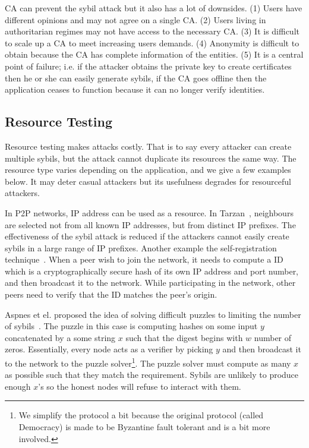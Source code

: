CA can prevent the sybil attack but it also has a lot of downsides. (1) Users
have different opinions and may not agree on a single CA. (2) Users living in
authoritarian regimes may not have access to the necessary CA. (3) It is
difficult to scale up a CA to meet increasing users demands. (4) Anonymity is
difficult to obtain because the CA has complete information of the entities. (5)
It is a central point of failure; i.e. if the attacker obtains the private key
to create certificates then he or she can easily generate sybils, if the CA goes
offline then the application ceases to function because it can no longer verify
identities.


\subsection{Resource Testing}\label{sec:resource-testing}
Resource testing makes attacks costly. That is to say every attacker can create
multiple sybils, but the attack cannot duplicate its resources the same way. The
resource type varies depending on the application, and we give a few examples
below. It may deter casual attackers but its usefulness degrades for resourceful
attackers.


In P2P networks, IP address can be used as a resource. In
Tarzan~\cite{freedman2002tarzan}, neighbours are selected not from all known IP
addresses, but from distinct IP prefixes. The effectiveness of the sybil attack
is reduced if the attackers cannot easily create sybils in a large range of IP
prefixes. Another example the self-registration
technique~\cite{dinger2006defending}. When a peer wish to join the network, it
needs to compute a ID which is a cryptographically secure hash of its own IP
address and port number, and then broadcast it to the network. While
participating in the network, other peers need to verify that the ID matches
the peer's origin.

Aspnes et el. proposed the idea of solving difficult puzzles to limiting the
number of sybils~\cite{aspnes2005exposing}. The puzzle in this case is computing
hashes on some input $y$ concatenated by a some string $x$ such that the digest
begins with $w$ number of zeros. Essentially, every node acts as a verifier by
picking $y$ and then broadcast it to the network to the puzzle
solver\footnote{We simplify the protocol a bit because the original protocol
  (called Democracy) is made to be Byzantine fault tolerant and is a bit more
  involved.}. The puzzle solver must compute as many $x$ as possible such that
they match the requirement. Sybils are unlikely to produce enough $x$'s so the
honest nodes will refuse to interact with them.

